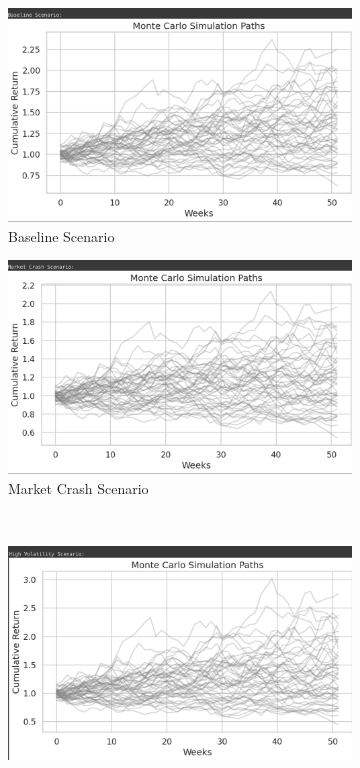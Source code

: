 \documentclass[a4paper,12pt]{article}
\begin{document}
\begin{figure}[H]
    \centering
    \begin{subfigure}[b]{0.45\textwidth}
        \centering
        \includegraphics[width=\textwidth]{figures/Figure6a.png}
        \caption{Baseline Scenario}
        \label{fig:stress_baseline}
    \end{subfigure}
    \hfill
    \begin{subfigure}[b]{0.45\textwidth}
        \centering
        \includegraphics[width=\textwidth]{figures/Figure6b.png}
        \caption{Market Crash Scenario}
        \label{fig:stress_crash}
    \end{subfigure}
    \\
    \begin{subfigure}[b]{0.45\textwidth}
        \centering
        \includegraphics[width=\textwidth]{figures/FIgure6c.png}

\end{subfigure}
\end{figure}
\end{document}
